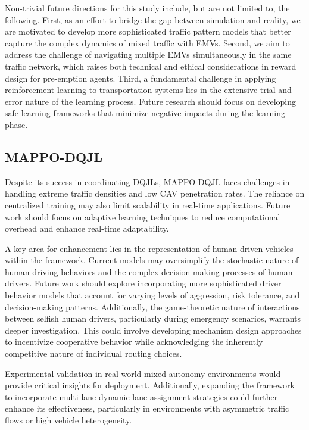 Non-trivial future directions for this study include, but are not limited to, the following. First, as an effort to bridge the gap between simulation and reality, we are motivated to develop more sophisticated traffic pattern models that better capture the complex dynamics of mixed traffic with EMVs. Second, we aim to address the challenge of navigating multiple EMVs simultaneously in the same traffic network, which raises both technical and ethical considerations in reward design for pre-emption agents. Third, a fundamental challenge in applying reinforcement learning to transportation systems lies in the extensive trial-and-error nature of the learning process. Future research should focus on developing safe learning frameworks that minimize negative impacts during the learning phase.

\subsection{MAPPO-DQJL}
Despite its success in coordinating DQJLs, MAPPO-DQJL faces challenges in handling extreme traffic densities and low CAV penetration rates. The reliance on centralized training may also limit scalability in real-time applications. Future work should focus on adaptive learning techniques to reduce computational overhead and enhance real-time adaptability.

A key area for enhancement lies in the representation of human-driven vehicles within the framework. Current models may oversimplify the stochastic nature of human driving behaviors and the complex decision-making processes of human drivers. Future work should explore incorporating more sophisticated driver behavior models that account for varying levels of aggression, risk tolerance, and decision-making patterns. Additionally, the game-theoretic nature of interactions between selfish human drivers, particularly during emergency scenarios, warrants deeper investigation. This could involve developing mechanism design approaches to incentivize cooperative behavior while acknowledging the inherently competitive nature of individual routing choices.

Experimental validation in real-world mixed autonomy environments would provide critical insights for deployment. Additionally, expanding the framework to incorporate multi-lane dynamic lane assignment strategies could further enhance its effectiveness, particularly in environments with asymmetric traffic flows or high vehicle heterogeneity.

